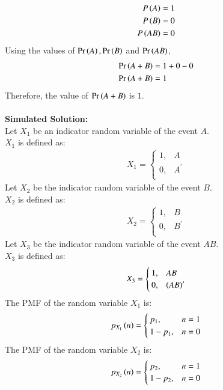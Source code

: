 \documentclass[journal]{IEEEtran}
\begin{document}
\begin{align}
    P\left(A\right)=1\\
    P\left(B\right)=0\\
    P\left(AB\right)=0
\end{align}
Using the values of $\Pr\left(A\right), \Pr\left(B\right)$ and $\Pr\left(AB\right)$,
\begin{align}
	\Pr\left(A + B\right) &= 1 + 0- 0\\
	\Pr\left(A + B\right) &= 1
\end{align}
Therefore, the value of $\Pr\left(A + B\right)$ is $1$.\\\\   

\textbf{Simulated Solution:\\}
Let $X_1$ be an indicator random variable of the event $A$.\\
$X_1$ is defined as:
\begin{align}
	X_1 =
	\begin{cases}
		1 ,& A\\
		0 ,& A^\prime\\
	\end{cases}
\end{align}
Let $X_2$ be the indicator random variable of the event $B$.\\
$X_2$ is defined as:
\begin{align}
	X_2 =
	\begin{cases}
		1 ,& B\\
		0 ,& B^\prime\\
	\end{cases}
\end{align}
Let $X_3$ be the indicator random variable of the event $AB$.\\
$X_3$ is defined as:
\begin{align}
	X_3 =
	\begin{cases}
		1 ,& AB\\
		0 ,& \left(AB\right)^\prime\\
	\end{cases}
\end{align}
The PMF of the random variable $X_1$ is:
\begin{align}
	p_{X_1}\left(n\right) =
	\begin{cases}
		p_1 ,& n = 1\\
		1 - p_1 ,& n = 0
	\end{cases}
\end{align}
The PMF of the random variable $X_2$ is:
\begin{align}
	p_{X_2}\left(n\right) =
	\begin{cases}
		p_2 ,& n = 1\\
		1 - p_2 ,& n = 0
	\end{cases}
\end{align}
\end{document}
